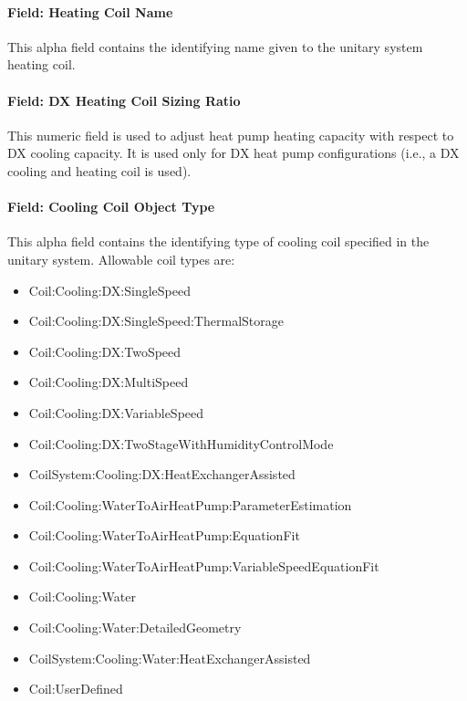 \paragraph{Field: Heating Coil Name}\label{field-heating-coil-name-002}

This alpha field contains the identifying name given to the unitary system heating coil.

\paragraph{Field: DX Heating Coil Sizing Ratio}\label{field-dx-heating-coil-sizing-ratio}

This numeric field is used to adjust heat pump heating capacity with respect to DX cooling capacity. It is used only for DX heat pump configurations (i.e., a DX cooling and heating coil is used).

\paragraph{Field: Cooling Coil Object Type}\label{field-cooling-coil-object-type-002}

This alpha field contains the identifying type of cooling coil specified in the unitary system. Allowable coil types are:

\begin{itemize}
\item
  Coil:Cooling:DX:SingleSpeed
\item
  Coil:Cooling:DX:SingleSpeed:ThermalStorage
\item
  Coil:Cooling:DX:TwoSpeed
\item
  Coil:Cooling:DX:MultiSpeed
\item
  Coil:Cooling:DX:VariableSpeed
\item
  Coil:Cooling:DX:TwoStageWithHumidityControlMode
\item
  CoilSystem:Cooling:DX:HeatExchangerAssisted
\item
  Coil:Cooling:WaterToAirHeatPump:ParameterEstimation
\item
  Coil:Cooling:WaterToAirHeatPump:EquationFit
\item
  Coil:Cooling:WaterToAirHeatPump:VariableSpeedEquationFit
\item
  Coil:Cooling:Water
\item
  Coil:Cooling:Water:DetailedGeometry
\item
  CoilSystem:Cooling:Water:HeatExchangerAssisted
\item
  Coil:UserDefined
\end{itemize}

